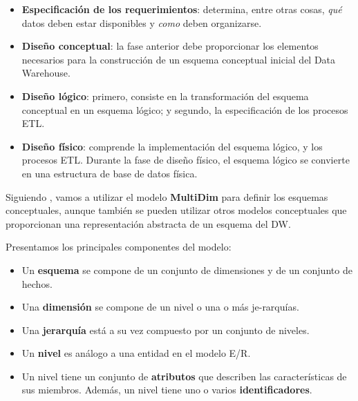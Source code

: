 \documentclass{fancyslides}
\begin{document}
\begin{frame}
\misc
{

\begin{itemize}
  \item \textbf{Especificación de los requerimientos}: \justifying determina, entre otras cosas, \textit{qué} datos deben estar disponibles y \textit{como} deben organizarse. 
  \item \textbf{Diseño conceptual}: \justifying la fase anterior debe proporcionar los elementos necesarios para la construcción de un esquema conceptual inicial del Data Warehouse.
  \item \textbf{Diseño lógico}: \justifying primero, consiste en la transformación del esquema conceptual en un esquema lógico; y segundo, la especificación de los procesos ETL.
  \item \textbf{Diseño físico}: \justifying comprende la implementación del esquema lógico, y los procesos ETL. Durante la fase de diseño físico, el esquema lógico se convierte en una estructura de base de datos física.
\end{itemize}

}
\end{frame}

\begin{frame}
\end{frame}

\begin{frame}
\misc
{
\justifying Siguiendo \cite{VaismanZimanyi14}, vamos a utilizar el modelo \textbf{MultiDim} para definir los esquemas conceptuales, aunque también se pueden utilizar otros modelos conceptuales que proporcionan una representación abstracta de un esquema del DW.
}
\end{frame}

\begin{frame}
\misc
{
Presentamos los principales componentes del modelo:
\begin{itemize}
  \item \justifying Un \textbf{esquema} se compone de un conjunto de dimensiones y de un conjunto de hechos.
  \item \justifying Una \textbf{dimensión} se compone de un nivel o una o más je-rarquías.
  \item \justifying Una \textbf{jerarquía} está a su vez compuesto por un conjunto de niveles.
  \item \justifying Un \textbf{nivel} es análogo a una entidad en el modelo E/R.
  \item \justifying Un nivel tiene un conjunto de \textbf{atributos} que describen las características de sus miembros. Además, un nivel tiene uno o varios \textbf{identificadores}.
\end{itemize}
}
\end{frame}
\end{document}
